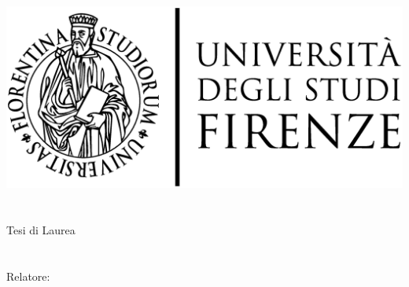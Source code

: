 \begin{titlepage}
	\begin{center}
   	\large
      \hfill
      \vfill
      \begingroup
         \includegraphics[scale=0.15]{gfx/logo/unifi}\\
			\myFaculty \\
			\myDegree \\ 
			\vspace{0.5cm}
         \vspace{0.5cm}    
         Tesi di Laurea    
      \endgroup 
      \vfill 
      \begingroup
      	\color{Maroon}\spacedallcaps{\myItalianTitle} \\ $\ $\\
      	\spacedallcaps{\myEnglishTitle} \\ 	
	\bigskip
      \endgroup
      \spacedlowsmallcaps{\myName}
      \vfill  
      Relatore: \itshape{\myProf}
      \vfill                   
      \myTime
      \vfill                      
	\end{center}        
\end{titlepage}   
